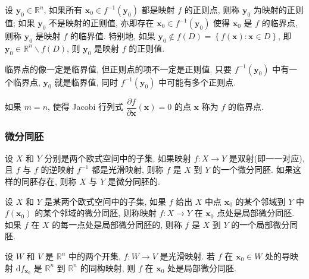 \begin{definition}
设 \(\boldsymbol{y}_0\in\mathbb{R}^n\), 如果所有 \(\boldsymbol{x}_0\in f^{-1}\left(\boldsymbol{y}_0\right)\) 都是映射 \(f\) 的正则点, 则称 \(\boldsymbol{y}_0\) 为映射的正则值; 如果 \(\boldsymbol{y}_0\) 不是映射的正则值, 亦即存在 \(\boldsymbol{x}_0\in f^{-1}\left(\boldsymbol{y}_0\right)\) 使得 \(\boldsymbol{x}_0\) 是 \(f\) 的临界点, 则称 \(\boldsymbol{y}_0\) 是映射 \(f\) 的临界值. 特别地, 如果 \(\boldsymbol{y}_0\notin f(D)=\left\lbrace f(\boldsymbol{x}): \boldsymbol{x}\in D\right\rbrace\), 即 \(\boldsymbol{y}_0\in\mathbb{R}^n\backslash f(D)\), 则 \(\boldsymbol{y}_0\) 是映射 \(f\) 的正则值.
\end{definition}

临界点的像一定是临界值, 但正则点的项不一定是正则值. 只要 \(f^{-1}\left(\boldsymbol{y}_0\right)\) 中有一个临界点, \(\boldsymbol{y}_0\) 就是临界值, 同时 \(f^{-1}\left(\boldsymbol{y}_0\right)\) 中可能有多个正则点.

如果 \(m=n\), 使得 Jacobi 行列式 \(\dfrac{\partial f}{\partial \boldsymbol{x}}\left(\boldsymbol{x}\right)=0\) 的点 \(\boldsymbol{x}\) 称为 \(f\) 的临界点.

\subsubsection{微分同胚}

\begin{definition}
设 \(X\) 和 \(Y\) 分别是两个欧式空间中的子集, 如果映射 \(f:X\to Y\) 是双射(即一一对应), 且 \(f\) 与 \(f\) 的逆映射 \(f^{-1}\) 都是光滑映射, 则称 \(f\) 是 \(X\) 到 \(Y\) 的一个微分同胚. 如果这样的同胚存在, 则称 \(X\) 与 \(Y\) 是微分同胚的.
\end{definition}

\begin{definition}
设 \(X\) 和 \(Y\) 是某两个欧式空间中的子集, 如果 \(f\) 给出 \(X\) 中点 \(\boldsymbol{x}_0\) 的某个邻域到 \(Y\) 中 \(f\left(\boldsymbol{x}_0\right)\) 的某个邻域的微分同胚, 则称映射 \(f:X\to Y\) 在 \(\boldsymbol{x}_0\) 点处是局部微分同胚. 如果 \(f\) 在 \(X\) 的每一点处是局部微分同胚的, 则称 \(f\) 是 \(X\) 到 \(Y\) 的一个局部微分同胚.
\end{definition}

\begin{theorem}[反函数定理]
设 \(W\) 和 \(V\) 是 \(\mathbb{R}^n\) 中的两个开集, \(f:W\to V\) 是光滑映射. 若 \(f\) 在 \(\boldsymbol{x}_0\in W\) 处的导映射 \(\mathrm{d}f_{\boldsymbol{x}_0}\) 是 \(\mathbb{R}^n\) 到 \(\mathbb{R}^n\) 的同构映射, 则 \(f\) 在 \(\boldsymbol{x}_0\) 处是局部微分同胚.
\end{theorem}

